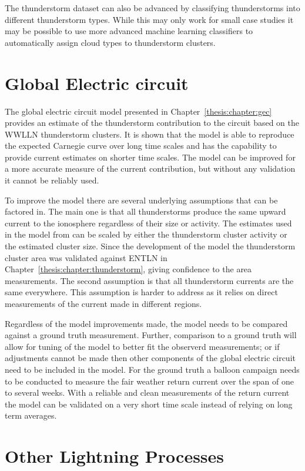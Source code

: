 The thunderstorm dataset can also be advanced by classifying thunderstorms into different thunderstorm types.
While this may only work for small case studies it may be possible to use more advanced machine learning classifiers to automatically assign cloud types to thunderstorm clusters.

\section{Global Electric circuit}

The global electric circuit model presented in Chapter~\ref{thesis:chapter:gec} provides an estimate of the thunderstorm contribution to the circuit based on the WWLLN thunderstorm clusters.
It is shown that the model is able to reproduce the expected Carnegie curve over long time scales and has the capability to provide current estimates on shorter time scales.
The model can be improved for a more accurate measure of the current contribution, but without any validation it cannot be reliably used.

To improve the model there are several underlying assumptions that can be factored in.
The main one is that all thunderstorms produce the same upward current to the ionosphere regardless of their size or activity.
The estimates used in the model from \citet{Mach2010} can be scaled by either the thunderstorm cluster activity or the estimated cluster size.
Since the development of the model the thunderstorm cluster area was validated against ENTLN in Chapter~\ref{thesis:chapter:thunderstorm}, giving confidence to the area measurements.
The second assumption is that all thunderstorm currents are the same everywhere.
This assumption is harder to address as it relies on direct measurements of the current made in different regions.

Regardless of the model improvements made, the model needs to be compared against a ground truth measurement.
Further, comparison to a ground truth will allow for tuning of the model to better fit the observerd measurements; or if adjustments cannot be made then other components of the global electric circuit need to be included in the model.
For the ground truth a balloon campaign needs to be conducted to measure the fair weather return current over the span of one to several weeks.
With a reliable and clean measurements of the return current the model can be validated on a very short time scale instead of relying on long term averages.

\section{Other Lightning Processes}

